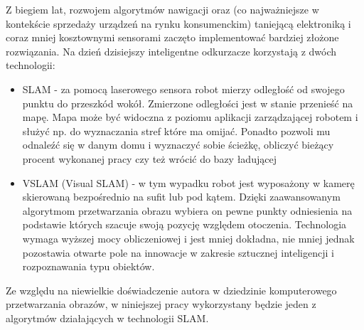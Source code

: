 Z biegiem lat, rozwojem algorytmów nawigacji oraz (co najważniejsze w kontekście sprzedaży urządzeń na rynku konsumenckim) taniejącą elektroniką i coraz mniej kosztownymi sensorami zaczęto implementować bardziej złożone rozwiązania. Na dzień dzisiejszy inteligentne odkurzacze korzystają z dwóch technologii:
\begin{itemize}
\item SLAM - za pomocą laserowego sensora robot mierzy odległość od swojego punktu do przeszkód wokół. Zmierzone odległości jest w stanie przenieść na mapę. Mapa może być widoczna z poziomu aplikacji zarządzającej robotem i służyć np. do wyznaczania stref które ma omijać. Ponadto pozwoli mu odnaleźć się w danym domu i wyznaczyć sobie ścieżkę, obliczyć bieżący procent wykonanej pracy czy też wrócić do bazy ładującej
\item VSLAM (Visual SLAM) - w tym wypadku robot jest wyposażony w kamerę skierowaną bezpośrednio na sufit lub pod kątem. Dzięki zaawansowanym algorytmom przetwarzania obrazu wybiera on pewne punkty odniesienia na podstawie których szacuje swoją pozycję względem otoczenia. Technologia wymaga wyższej mocy obliczeniowej i jest mniej dokładna, nie mniej jednak pozostawia otwarte pole na innowacje w zakresie sztucznej inteligencji i rozpoznawania typu obiektów.
\end{itemize}

Ze względu na niewielkie doświadczenie autora w dziedzinie komputerowego przetwarzania obrazów, w niniejszej pracy wykorzystany będzie jeden z algorytmów działających w technologii SLAM. 


